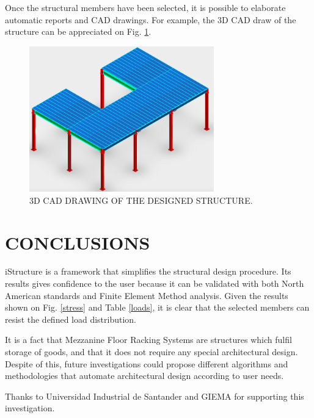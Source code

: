 \documentclass[twocolumn,10pt]{asme2e}
\begin{document}
Once the structural members have been selected, it is possible to elaborate automatic reports and CAD drawings. For example, the 3D CAD draw of the structure can be appreciated on Fig. \ref{CAD}.

\begin{figure}[t]
\centering
\includegraphics[width=8cm]{Images/RES.PNG}
\caption{3D CAD DRAWING OF THE DESIGNED STRUCTURE.}
\label{CAD}
\end{figure} 

\section*{CONCLUSIONS}

iStructure is a framework that simplifies the structural design procedure. Its results gives confidence to the user because it can be validated with both North American standards and Finite Element Method analysis. Given the results shown on Fig. \ref{stress} and Table \ref{loads}, it is clear that the selected members can resist the defined load distribution. 

It is a fact that Mezzanine Floor Racking Systems are structures which fulfil storage of goods, and that it does not require any special architectural design. Despite of this, future investigations could propose different algorithms and methodologies that automate architectural design according to user needs.


\begin{acknowledgment}

Thanks to Universidad Industrial de Santander and GIEMA for supporting this investigation.  

\end{acknowledgment}

%


\end{document}
